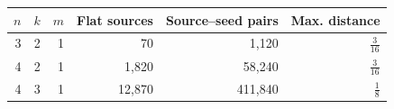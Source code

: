 \begin{tabular}{rrrrrr}
\toprule
$n$ & $k$ & $m$ & Flat sources & Source--seed pairs & Max. distance \\
\midrule
3 & 2 & 1 & 70 & 1,120 & $\frac{3}{16}$ \\
4 & 2 & 1 & 1,820 & 58,240 & $\frac{3}{16}$ \\
4 & 3 & 1 & 12,870 & 411,840 & $\frac{1}{8}$ \\
\bottomrule
\end{tabular}
